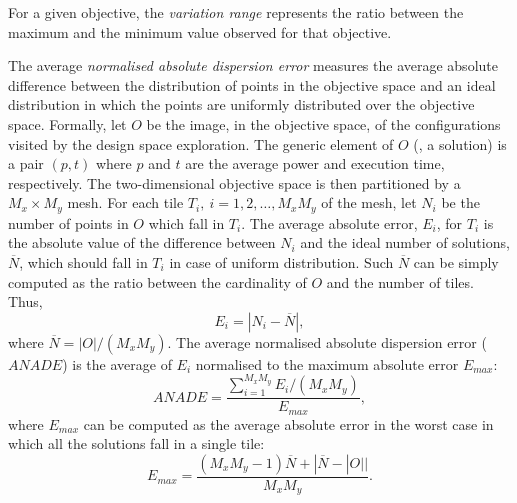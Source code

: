 For a given objective, the \emph{variation range} represents the ratio between the maximum and the minimum value observed for that objective.


The average \emph{normalised absolute dispersion error} measures
the average absolute difference between the distribution of points in
the objective space and an ideal distribution in which the points are
uniformly distributed over the objective space. 
Formally, let $O$ be
the image, in the objective space, of the configurations visited by
the design space exploration. The generic element of $O$ (\ie, a
solution) is a pair $(p,t)$ where $p$ and $t$ are the average power
and execution time, respectively. The two-dimensional objective space
is then partitioned by a $M_x \times M_y$ mesh. For each tile $T_i,
\ i=1, 2, \ldots, M_xM_y$ of the mesh, let $N_i$ be the number
of points in $O$ which fall in $T_i$. The average absolute error, $E_i$, for
$T_i$ is the absolute value of the difference between $N_i$ and the
ideal number of solutions, $\overline{N}$, which should fall in $T_i$
in case of uniform distribution. Such $\overline{N}$ can be simply
computed as the ratio between the cardinality of $O$ and the number of
tiles. Thus,
\[ E_i = |N_i - \overline{N}|, \]
where $\overline{N} = |O| / (M_x M_y)$. The average
normalised absolute dispersion error ($ANADE$) is the average of $E_i$
normalised to the maximum absolute error $E_{max}$:
\[ ANADE = \frac{\sum_{i=1}^{M_xM_y} E_i/(M_xM_y)}{E_{max}}, \]
where $E_{max}$ can be computed as the average absolute error in the worst
case in which all the solutions fall in a single tile:
\[ E_{max} = \frac{(M_x M_y - 1) \overline{N} + |\overline{N} -
    |O|| }{M_x M_y}. \] 

